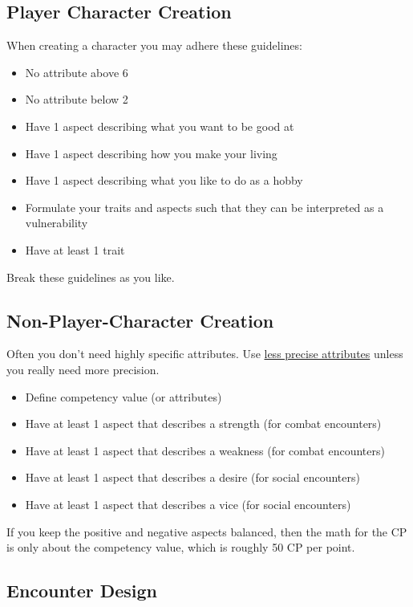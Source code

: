 \documentclass[11pt]{article}
\begin{document}
{\subsection{Player Character Creation}
\label{sec:org28b8195}

When creating a character you may adhere these guidelines:
\begin{itemize}
\item No attribute above 6
\item No attribute below 2
\item Have 1 aspect describing what you want to be good at
\item Have 1 aspect describing how you make your living
\item Have 1 aspect describing what you like to do as a hobby
\item Formulate your traits and aspects such that they can be interpreted as a vulnerability
\item Have at least 1 trait
\end{itemize}
Break these guidelines as you like.
\subsection{Non-Player-Character Creation}
\label{sec:org83991e4}

Often you don't need highly specific attributes. Use \hyperref[sec:org59dcf34]{less precise attributes} unless you really need more precision.
\begin{itemize}
\item Define competency value (or attributes)
\item Have at least 1 aspect that describes a strength (for combat encounters)
\item Have at least 1 aspect that describes a weakness (for combat encounters)
\item Have at least 1 aspect that describes a desire (for social encounters)
\item Have at least 1 aspect that describes a vice (for social encounters)
\end{itemize}
If you keep the positive and negative aspects balanced, then the math for the CP is only about the competency value, which is roughly 50 CP per point.
\subsection{Encounter Design}
\label{sec:orgd0b9dbb}

}
\end{document}

